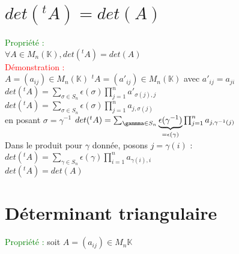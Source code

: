 \documentclass{article}
\begin{document}
	\section{$det({}^tA)=det(A)$}
	\textcolor{green}{Propriété :} \\
	$\forall A \in M_n(\mathbb K), det({}^tA)=det(A)$ \\
	\textcolor{red}{Démonstration :} \\
	$A=(a_{ij}) \in M_n(\mathbb K)$  ${}^tA=(a'_{ij}) \in M_n(\mathbb K)$ avec $a'_{ij}=a_{ji}$ \\
	$det({}^tA)= \sum_{\sigma \in S_n} \epsilon(\sigma) \prod_{j=1}^n a'_{\sigma(j),j}$ \\
	$det({}^tA)= \sum_{\sigma \in S_n} \epsilon(\sigma) \prod_{j=1}^n a_{j,\sigma(j)}$  \\
	en posant $\sigma= \gamma^{-1}$ $det({}^tA)= \sum_{\gammma \in S_n} \underbrace{\epsilon(\gamma^{-1})}_{=\epsilon(\gamma)} \prod_{j=1}^n a_{j,\gamma^{-1}(j)}$ \\
	Dans le produit pour $\gamma$ donnée, posons $j= \gamma(i)$ : \\
	$det({}^tA)= \sum_{\gamma \in S_n} \epsilon(\gamma) \prod_{i=1}^n a_{\gamma(i),i}$ \\
	$det({}^tA)=det(A)$
	\section{Déterminant triangulaire}
	\textcolor{green}{Propriété :} soit $A=(a_{ij}) \in M_n{\mathbb K}$
	
\end{document}
